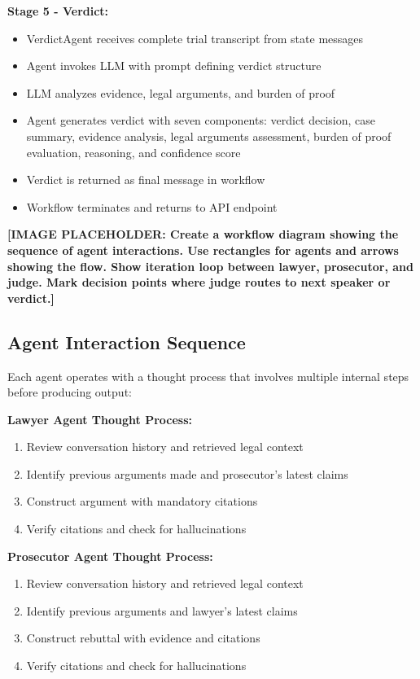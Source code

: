 \documentclass[12pt,singleside,a4paper]{article}
\begin{document}
\textbf{Stage 5 - Verdict:}
\begin{itemize}
\item VerdictAgent receives complete trial transcript from state messages
\item Agent invokes LLM with prompt defining verdict structure
\item LLM analyzes evidence, legal arguments, and burden of proof
\item Agent generates verdict with seven components: verdict decision, case summary, evidence analysis, legal arguments assessment, burden of proof evaluation, reasoning, and confidence score
\item Verdict is returned as final message in workflow
\item Workflow terminates and returns to API endpoint
\end{itemize}

\textbf{[IMAGE PLACEHOLDER: Create a workflow diagram showing the sequence of agent interactions. Use rectangles for agents and arrows showing the flow. Show iteration loop between lawyer, prosecutor, and judge. Mark decision points where judge routes to next speaker or verdict.]}

\subsection{Agent Interaction Sequence}
Each agent operates with a thought process that involves multiple internal steps before producing output:

\textbf{Lawyer Agent Thought Process:}
\begin{enumerate}
\item Review conversation history and retrieved legal context
\item Identify previous arguments made and prosecutor's latest claims
\item Construct argument with mandatory citations
\item Verify citations and check for hallucinations
\end{enumerate}

\textbf{Prosecutor Agent Thought Process:}
\begin{enumerate}
\item Review conversation history and retrieved legal context
\item Identify previous arguments and lawyer's latest claims
\item Construct rebuttal with evidence and citations
\item Verify citations and check for hallucinations
\end{enumerate}
\end{document}
